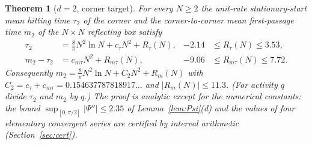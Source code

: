 \documentclass[11pt,a4paper]{article}
\theoremstyle{plain}
\newtheorem{theorem}{Theorem}[section]
\theoremstyle{definition}
\numberwithin{equation}{section}
\begin{document}
\begin{theorem}[$d=2$, corner target]\label{thm:d2}
For every $N\ge2$ the unit-rate stationary-start mean hitting time $\tau_2$ of the corner and the corner-to-corner mean first-passage time $m_2$ of the $N\times N$ reflecting box satisfy
\begin{align}
\tau_2&=\frac8\pi N^2\ln N+c_\tau N^2+R_\tau(N),&-2.14&\le R_\tau(N)\le3.53,\label{eq:tau2}\\
m_2-\tau_2&=c_{m\tau}N^2+R_{m\tau}(N),&-9.06&\le R_{m\tau}(N)\le7.72 .\label{eq:m2}
\end{align}
Consequently $m_2=\frac8\pi N^2\ln N+C_2N^2+R_m(N)$ with $C_2=c_\tau+c_{m\tau}=0.154637787818917\ldots$ and $|R_m(N)|\le11.3$.
(For activity $q$ divide $\tau_2$ and $m_2$ by $q$.) The proof is analytic except for the numerical constants: the bound $\sup_{[0,\pi/2]}|\Psi''|\le2.35$ of Lemma~\ref{lem:Psi}(d) and the values of four elementary convergent series are certified by interval arithmetic (Section~\ref{sec:cert}).
\end{theorem}
\end{document}
